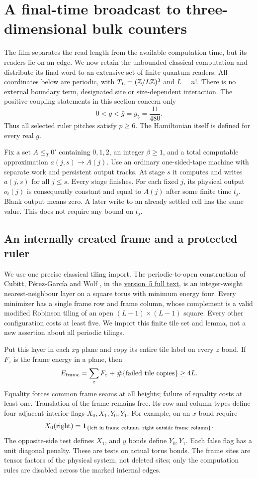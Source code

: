 \section{A final-time broadcast to three-dimensional bulk counters}
\label{sec:bulk-three}
The film separates the read length from the available computation time,
but its readers lie on an edge. We now retain the unbounded classical
computation and distribute its final word to an extensive set of finite
quantum readers. All coordinates below are periodic, with
$T_L=(\mathbb Z/L\mathbb Z)^3$ and $L=n!$. There is no external boundary term,
designated site or size-dependent interaction. The positive-coupling
statements in this section concern only
\[
 0<g<\bar g=g_5=\frac{11}{480}.
\]
Thus all selected ruler pitches satisfy $p\geq6$. The Hamiltonian
itself is defined for every real $g$.

Fix a set $A\leq_T0'$ containing $0,1,2$, an integer $\beta\geq1$,
and a total computable approximation $a(j,s)\to A(j)$.
Use an ordinary one-sided-tape machine with separate work and persistent
output tracks. At stage $s$ it computes and writes $a(j,s)$ for all
$j\leq s$. Every stage finishes. For each fixed $j$, its physical output
$o_t(j)$ is consequently constant and equal to $A(j)$ after some finite
time $t_j$. Blank output means zero. A later write to an already settled
cell has the same value. This does not require any bound on $t_j$.

\subsection{An internally created frame and a protected ruler}
We use one precise classical tiling import. The periodic-to-open
construction of Cubitt, P\'erez-Garc\'ia and Wolf
\cite[Section~6.3, equation~(133), Lemma~55]{spectralFull}, in the
\href{https://arxiv.org/abs/1502.04573v5}{version~5 full text}, is an
integer-weight nearest-neighbour layer on a square torus with minimum
energy four. Every minimizer has a single frame row and frame column,
whose complement is a valid modified Robinson tiling of an open
$(L-1)\times(L-1)$ square. Every other configuration costs at least
five. We import this finite tile set and lemma, not a new assertion
about all periodic tilings.

Put this layer in each $xy$ plane and copy its entire tile label on
every $z$ bond. If $F_z$ is the frame energy in a plane, then
\[
 E_{\rm frame}=\sum_z F_z+\#\{\text{failed tile copies}\}\geq4L.
\]
Equality forces common frame seams at all heights; failure of equality
costs at least one. Translation of the frame remains free. Its row and
column types define four adjacent-interior flags $X_0,X_1,Y_0,Y_1$.
For example, on an $x$ bond require
\[
 X_0(\text{right})=
 \mathbf 1_{\{\text{left in frame column, right outside frame column}\}}.
\]
The opposite-side test defines $X_1$, and $y$ bonds define $Y_0,Y_1$.
Each false flag has a unit diagonal penalty. These are tests on actual
torus bonds. The frame sites are tensor factors of the physical system,
not deleted sites; only the computation rules are disabled across the
marked internal edges.

